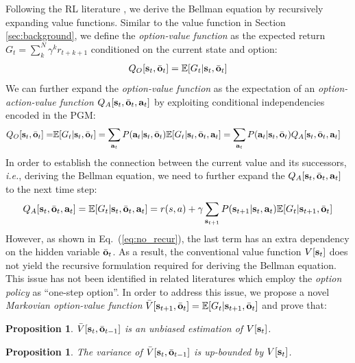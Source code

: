 \documentclass{article}
\newtheorem{prop}[thm]{Proposition}
\begin{document}
Following the RL literature \cite{sutton2018reinforcement}, we
derive the Bellman equation by recursively expanding value
functions. Similar to the value function in Section
\ref{sec:background}, we define the \emph{option-value function}
as the expected return $G_t = \sum_k^N\gamma^kr_{t+k+1}$
conditioned on the current state and option:
\begin{align}
  \label{eq:sa_q_o}
  Q_O[{\mathbf{s}}_t,\bar{{\mathbf{o}}}_{t}]=\mathbb{E}[G_t|{\mathbf{s}}_t,\bar{{\mathbf{o}}}_{t}]
\end{align}
We can further expand the \emph{option-value function} as the
expectation of an \emph{option-action-value function} $Q_A[
{\mathbf{s}}_t,\bar{{\mathbf{o}}}_t,{\mathbf{a}}_t]$ by exploiting conditional
independencies encoded in the PGM:
\begin{align}
\label{eq:sa_q_a}
  Q_O[\rvs_t,\bar{\rvo}_{t}]=&\E[G_t|\rvs_t,\bar{\rvo}_{t}]  =\sum_{\rva_t}P(\rva_t|\rvs_t,\bar{\rvo}_{t})\E[G_t|\rvs_t,\bar{\rvo}_t,\rva_t]=\sum_{\rva_t}P(\rva_t|\rvs_t,\bar{\rvo}_{t})Q_A[ \rvs_t,\bar{\rvo}_t,\rva_t]
  \vspace{-5mm}
\end{align}
In order to establish the connection between the current value
and its successors, \textit{i.e.}, deriving the Bellman equation, we need
to further expand the $Q_A[ {\mathbf{s}}_t,\bar{{\mathbf{o}}}_t,{\mathbf{a}}_t]$ to the
next time step:
\begin{align}
  \label{eq:no_recur}
  Q_A[ \rvs_t,\bar{\rvo}_t,\rva_t]=\E[G_t| \rvs_t,\bar{\rvo}_t,\rva_t]=
  r(s,a) + \gamma\sum_{\rvs_{t+1}}P(\rvs_{t+1}|\rvs_t,\rva_t)\E[G_t|\rvs_{t+1},\bar{\rvo}_t]
  \vspace{-5mm}
\end{align}
However, as shown in Eq.~(\ref{eq:no_recur}), the last term has an
extra dependency on the hidden variable $\bar{{\mathbf{o}}}_t$. As a
result, the conventional value function $V[{\mathbf{s}}_t]$ does not
yield the recursive formulation required for deriving the Bellman
equation. This issue has not been identified in related
literatures
\cite{henderson2018optiongan,sharma2018directed,shankar2020learning,lee2020learning,zhang2019dac}
which employ the \emph{option policy} as ``one-step option''. In
order to address this issue, we propose a novel \emph{Markovian
  option-value function}
$\bar{V}[{\mathbf{s}}_{t+1},\bar{{\mathbf{o}}}_{t}]=\mathbb{E}[G_t|{\mathbf{s}}_{t+1},\bar{{\mathbf{o}}}_t]$
and prove that:
\begin{prop}
  \label{prop:var_unb}
  $\bar{V}[{\mathbf{s}}_t,\bar{{\mathbf{o}}}_{t-1} ]$ is an unbiased estimation
  of $V[ {\mathbf{s}}_t ]$.
\end{prop}
\begin{prop}
  \label{prop:var_red}
  The variance of $\bar{V}[{\mathbf{s}}_t,\bar{{\mathbf{o}}}_{t-1} ]$ is
  up-bounded by $V[ {\mathbf{s}}_t ]$.
\end{prop}
\end{document}
